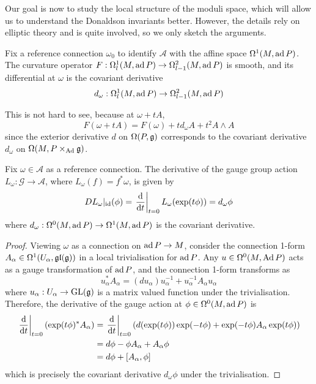 \begin{comment}
The space of gauge connections $\mathcal{A}$ on a principal bundle is the
universal bundle for the group of gauge transformations $\mathcal{G}$. (ch 15
Cordes)
\end{comment}

Our goal is now to study the local structure of the moduli space, which will
allow us to understand the Donaldson invariants better. However, the details
rely on elliptic theory and is quite involved, so we only sketch the arguments.
\begin{prop} \label{prop:curvature_derivative}
Fix a reference connection $\omega_0$ to identify
$\mathcal{A}$ with the affine space $\Omega^1(M,\operatorname{ad} P)$. 
The curvature operator $F:\Omega^1_{l}(M,\operatorname{ad} P) \to \Omega^2_{l-1}(M,\operatorname{ad} P)$ is smooth, and
its differential at $\omega$ is the covariant derivative
\[
d_{\omega} : \Omega^1_{l}(M,\operatorname{ad} P) \to \Omega^2_{l-1}(M,\operatorname{ad} P)
\]
\end{prop}
\noindent
This is not hard to see, because at $\omega + tA$,
\[
F(\omega + tA) = F(\omega) + t d_{\omega}A + t^2 A\wedge A 
\] %
since the exterior derivative $d$ on $\Omega(P,\operatorname{\mathfrak{g}})$ corresponds to the covariant
derivative $d_{\omega}$ on $\Omega(M,P\times_{\operatorname{Ad}}\operatorname{\mathfrak{g}})$. 

\begin{prop} \label{prop:gauge_derivative} %
	Fix $\omega \in \mathcal{A}$ as a reference connection. 
	The derivative of the gauge group action 
	$L_\omega : \mathcal{G} \to \mathcal{A}$, where $L_\omega(f) = f^*\omega$, 
	is given by 
	\[
	DL_\omega|_{\id}(\phi) = \odv{}{t}_{t=0} L_\omega(\exp(t\phi)) = d_\omega \phi
	\] 
	where $d_\omega : \Omega^0(M,\operatorname{ad} P) \to \Omega^1(M,\operatorname{ad} P)$ is the covariant
	derivative.
\end{prop}
\begin{proof}
	Viewing $\omega$ as a connection on  $\operatorname{ad} P \to M$, 
	consider the connection 1-form $A_\alpha \in \Omega^1(U_\alpha,\operatorname{\mathfrak{gl}}(\operatorname{\mathfrak{g}}))$ in a 
	local trivialisation for $\operatorname{ad} P$. Any $u \in \Omega^0(M,\operatorname{Ad} P)$ acts as a 
	gauge transformation of $\operatorname{ad} P$, and the connection 1-form transforms as 
	\[
	u_\alpha^*A_\alpha = (du_\alpha) u_\alpha^{-1} + u_\alpha^{-1}A_\alpha u_\alpha
	\] 
	where $u_\alpha : U_\alpha \to\operatorname{GL}(\operatorname{\mathfrak{g}})$ is a matrix valued function 
	under the trivialisation.  
	Therefore, the derivative of the gauge action at $\phi\in \Omega^0(M,\operatorname{ad} P)$ is 
	\begin{align*}
		\odv{}{t}_{t=0} (\exp(t\phi)^* A_\alpha)
		&= \odv{}{t}_{t=0} (d(\exp(t\phi))\exp(-t\phi)
		+ \exp(-t\phi)A_\alpha\exp(t\phi)) \\
		&= d\phi -\phi A_\alpha + A_\alpha\phi \\
		&= d\phi + [A_\alpha, \phi] 
	\end{align*}
	which is precisely the covariant derivative $d_\omega \phi$ under the trivialisation.
\end{proof}

